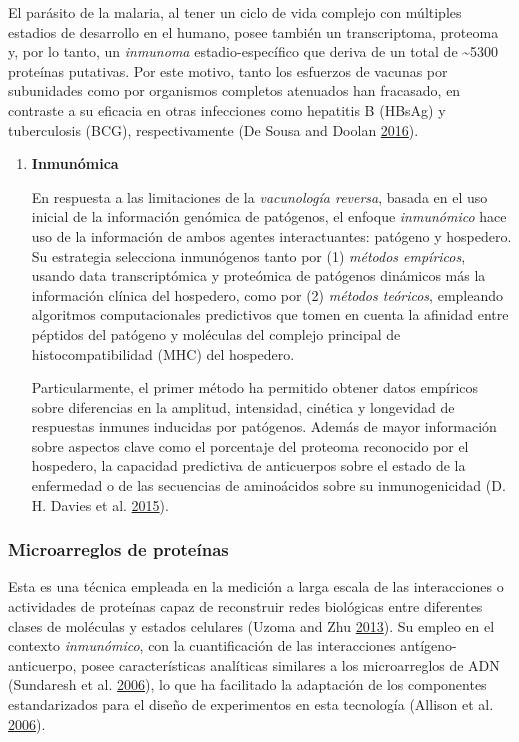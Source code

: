 \documentclass[a4paper]{article}
\begin{document}
\begin{enumerate}
  El parásito de la malaria, al tener un ciclo de vida complejo con
  múltiples estadios de desarrollo en el humano, posee también un
  transcriptoma, proteoma y, por lo tanto, un \emph{inmunoma}
  estadio-específico que deriva de un total de \textasciitilde{}5300
  proteínas putativas. Por este motivo, tanto los esfuerzos de vacunas
  por subunidades como por organismos completos atenuados han fracasado,
  en contraste a su eficacia en otras infecciones como hepatitis B
  (HBsAg) y tuberculosis (BCG), respectivamente (De Sousa and Doolan
  \protect\hyperlink{ref-immunomics2016}{2016}).

  \begin{enumerate}
  \def\labelenumii{\roman{enumii}.}
  \item
    \textbf{Inmunómica}

    En respuesta a las limitaciones de la \emph{vacunología reversa},
    basada en el uso inicial de la información genómica de patógenos, el
    enfoque \emph{inmunómico} hace uso de la información de ambos
    agentes interactuantes: patógeno y hospedero. Su estrategia
    selecciona inmunógenos tanto por (1) \emph{métodos empíricos},
    usando data transcriptómica y proteómica de patógenos dinámicos más
    la información clínica del hospedero, como por (2) \emph{métodos
    teóricos}, empleando algoritmos computacionales predictivos que
    tomen en cuenta la afinidad entre péptidos del patógeno y moléculas
    del complejo principal de histocompatibilidad (MHC) del hospedero.

    Particularmente, el primer método ha permitido obtener datos
    empíricos sobre diferencias en la amplitud, intensidad, cinética y
    longevidad de respuestas inmunes inducidas por patógenos. Además de
    mayor información sobre aspectos clave como el porcentaje del
    proteoma reconocido por el hospedero, la capacidad predictiva de
    anticuerpos sobre el estado de la enfermedad o de las secuencias de
    aminoácidos sobre su inmunogenicidad (D. H. Davies et al.
    \protect\hyperlink{ref-Davies2015Large}{2015}). 
  \end{enumerate}
\end{enumerate}

\subsubsection{Microarreglos de
proteínas}\label{microarreglos-de-proteinas}

Esta es una técnica empleada en la medición a larga escala de las
interacciones o actividades de proteínas capaz de reconstruir redes
biológicas entre diferentes clases de moléculas y estados celulares
(Uzoma and Zhu \protect\hyperlink{ref-uzoma2013interactome}{2013}). Su
empleo en el contexto \emph{inmunómico}, con la cuantificación de las
interacciones antígeno-anticuerpo, posee características analíticas
similares a los microarreglos de ADN (Sundaresh et al.
\protect\hyperlink{ref-sundaresh2006}{2006}), lo que ha facilitado la
adaptación de los componentes estandarizados para el diseño de
experimentos en esta tecnología (Allison et al.
\protect\hyperlink{ref-allison2006}{2006}).
\end{document}
